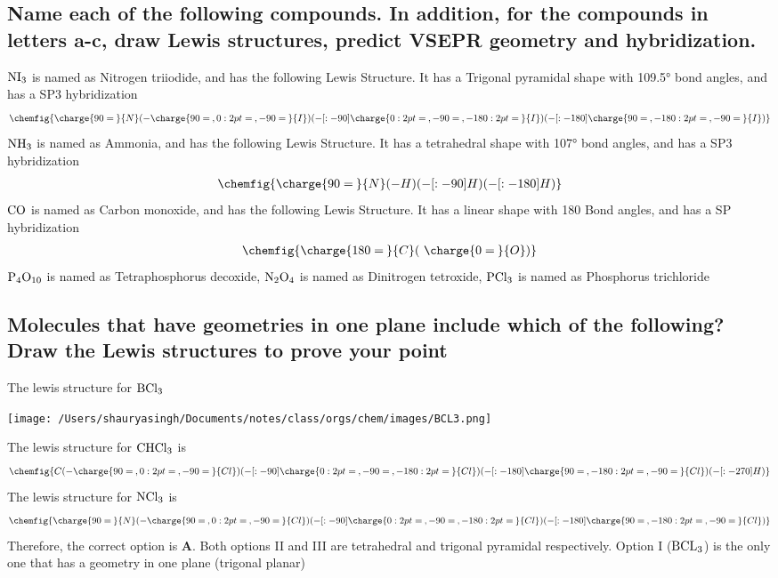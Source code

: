 \documentclass[11pt]{article}
\begin{document}
\subsection{Name each of the following compounds. In addition, for the compounds in letters a-c, draw Lewis structures, predict VSEPR geometry and hybridization.}
\label{sec:org68373e8}
\(\ce{NI3}\) is named as Nitrogen triiodide, and has the following Lewis Structure. It has a Trigonal pyramidal shape with 109.5° bond angles, and has a SP3 hybridization
\begin{align}
\chemfig{\charge{90=\:}{N}(-\charge{90=\:, 0:2pt=\:, -90=\:}{I})(-[:-90]\charge{0:2pt=\:, -90=\:, -180:2pt=\:}{I})(-[:-180]\charge{90=\:, -180:2pt=\:, -90=\:}{I})}
\end{align}
\(\ce{NH3}\) is named as Ammonia, and has the following Lewis Structure. It has a tetrahedral shape with 107° bond angles, and has a SP3 hybridization
\begin{align}
\chemfig{\charge{90=\:}{N}(-{H})(-[:-90]{H})(-[:-180]{H})}
\end{align}
\(\ce{CO}\) is named as Carbon monoxide, and has the following Lewis Structure. It has a linear shape with 180\textdegree{} Bond angles, and has a SP hybridization
\begin{align}
\chemfig{\charge{180=\:}{C}(~\charge{0=\:}{O})}
\end{align}
\(\ce{P4O10}\) is named as Tetraphosphorus decoxide,
\(\ce{N2O4}\) is named as Dinitrogen tetroxide,
\(\ce{PCl3}\) is named as Phosphorus trichloride

\subsection{Molecules that have geometries in one plane include which of the following? Draw the Lewis structures to prove your point}
\label{sec:orga451956}
The lewis structure for \(\ce{BCl3}\)
\begin{center}
\texttt{[image: /Users/shauryasingh/Documents/notes/class/orgs/chem/images/BCL3.png]}
\end{center}
The lewis structure for \(\ce{CHCl3}\) is
\begin{align}
\chemfig{{C}(-\charge{90=\:, 0:2pt=\:, -90=\:}{Cl})(-[:-90]\charge{0:2pt=\:, -90=\:, -180:2pt=\:}{Cl})(-[:-180]\charge{90=\:, -180:2pt=\:, -90=\:}{Cl})(-[:-270]{H})}
\end{align}
The lewis structure for \(\ce{NCl3}\) is
\begin{align}
\chemfig{\charge{90=\:}{N}(-\charge{90=\:, 0:2pt=\:, -90=\:}{Cl})(-[:-90]\charge{0:2pt=\:, -90=\:, -180:2pt=\:}{Cl})(-[:-180]\charge{90=\:, -180:2pt=\:, -90=\:}{Cl})}
\end{align}
Therefore, the correct option is \textbf{A}. Both options II and III are tetrahedral and trigonal pyramidal respectively. Option I (\(\ce{BCL3}\)) is the only one that has a geometry in one plane (trigonal planar)
\end{document}
